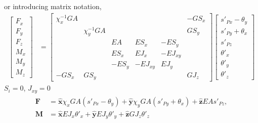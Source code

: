 \documentclass[letterpaper,10pt,english]{jupyterBook}
\begin{document}
\sphinxAtStartPar
or introducing matrix notation,
\begin{equation*}
\begin{split}\begin{bmatrix}
  F_x \\ F_y \\ F_z \\ M_x \\ M_y \\ M_z
\end{bmatrix} & = 
\begin{bmatrix}
 \chi_x^{-1} GA &                &          &          &          & -GS_x  \\ 
                & \chi_y^{-1} GA &          &          &          &  GS_y  \\ 
                &                &  EA      &  ES_x    & -ES_y    &        \\ 
                &                &  ES_x    &  EJ_x    & -EJ_{xy} &        \\ 
                &                & -ES_y    & -EJ_{xy} &  EJ_y    &        \\ 
 -GS_x          & GS_y           &          &          &          & GJ_z      
\end{bmatrix}
\begin{bmatrix}
  s'_{Px} - \theta_y \\
  s'_{Py} + \theta_x \\
  s'_{Pz}            \\
  \theta'_{x}        \\
  \theta'_{y}        \\
  \theta'_{z}          
\end{bmatrix}\end{split}
\end{equation*}
\sphinxAtStartPar
{} \(S_i = 0\), \(J_{xy} = 0\)
\begin{equation*}
\begin{split}\begin{aligned}
  \mathbf{F} 
  & = \hat{\mathbf{x}} \chi_x GA ( s'_{Px} - \theta_y )
    + \hat{\mathbf{y}} \chi_y GA ( s'_{Py} + \theta_x ) 
    + \hat{\mathbf{z}} EA s'_{Pz} , \\
  \mathbf{M} 
  & = \hat{\mathbf{x}} E J_{x}  \theta'_x
    + \hat{\mathbf{y}} E J_{y}  \theta'_y
    + \hat{\mathbf{z}} G J_z \theta'_z
\end{aligned}\end{split}
\end{equation*}
\end{document}
